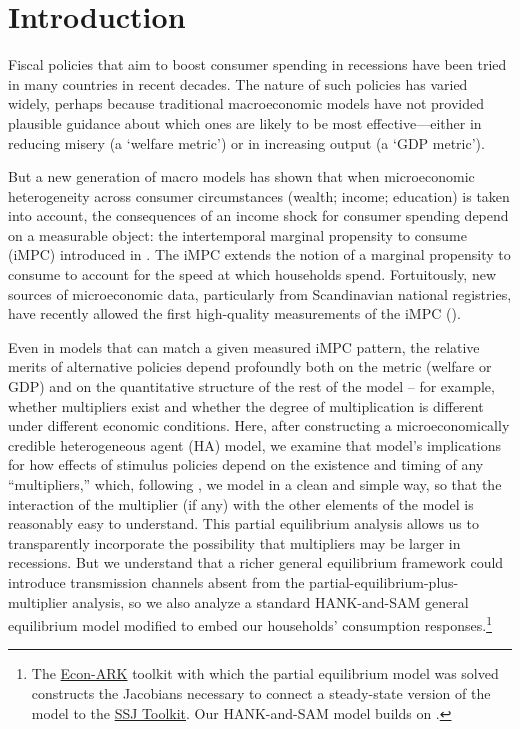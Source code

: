\documentclass[\econtexRoot/HAFiscal]{subfiles}
\begin{document}
\hypertarget{introduction}{}\par\section{Introduction}\notinsubfile{\label{sec:intro}}
\setcounter{page}{0}

Fiscal policies that aim to boost consumer spending in recessions have been tried in many countries in recent decades.  The nature of such policies has varied widely, perhaps because traditional macroeconomic models have not provided plausible guidance about which ones are likely to be most effective---either in reducing misery (a `welfare metric') or in increasing output (a `GDP metric').

But a new generation of macro models has shown that when microeconomic heterogeneity across consumer circumstances (wealth; income; education) is taken into account, the consequences of an income shock for consumer spending depend on a measurable object: the intertemporal marginal propensity to consume (iMPC) introduced in \cite{auclert2018IKC}.  The iMPC extends the notion of a marginal propensity to consume to account for the speed at which households spend.  Fortuitously, new sources of microeconomic data, particularly from Scandinavian national registries, have recently allowed the first high-quality measurements of the iMPC (\cite{fagereng_mpc_2021}).

Even in models that can match a given measured iMPC pattern, the relative merits of alternative policies depend profoundly both on the metric (welfare or GDP) and on the quantitative structure of the rest of the model -- for example, whether multipliers exist and whether the degree of multiplication is different under different economic conditions. Here, after constructing a microeconomically credible heterogeneous agent (HA) model, we examine that model's implications for how effects of stimulus policies depend on the existence and timing of any ``multipliers,'' which, following \cite{kmpHandbook2016}, we model in a clean and simple way, so that the interaction of the multiplier (if any) with the other elements of the model is reasonably easy to understand. %
This partial equilibrium analysis allows us to transparently incorporate the possibility that multipliers may be larger in recessions.  But we understand that a richer general equilibrium framework could introduce transmission channels absent from the partial-equilibrium-plus-multiplier analysis, so we also analyze a standard HANK-and-SAM general equilibrium model modified to embed our households' consumption responses.\footnote{The \href{https://econ-ark.org}{Econ-ARK} toolkit with which the partial equilibrium model was solved constructs the Jacobians necessary to connect a steady-state version of the model to the \href{https://github.com/shade-econ/sequence-jacobian}{SSJ Toolkit}. Our HANK-and-SAM model builds on \cite{Ravn2017,Ravn2021}.}
\end{document}
